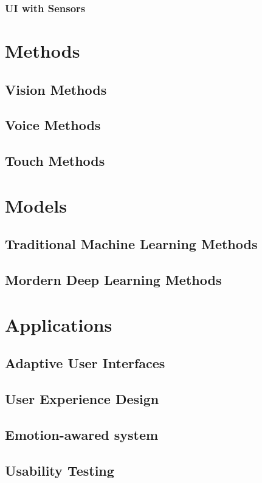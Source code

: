 \documentclass[journal]{vgtc}
\begin{document}
\subsubsection{UI with Sensors}

\section{Methods}
\subsection{Vision Methods}
\subsection{Voice Methods}
\subsection{Touch Methods}

\section{Models}
\subsection{Traditional Machine Learning Methods}
\subsection{Mordern Deep Learning Methods}

\section{Applications}
\subsection{Adaptive User Interfaces}
\subsection{User Experience Design}
\subsection{Emotion-awared system}
\subsection{Usability Testing}
\end{document}
